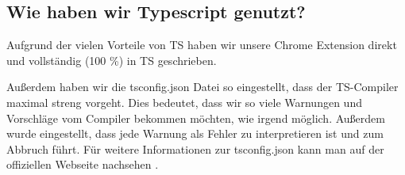 \subsection{Wie haben wir Typescript genutzt?}

Aufgrund der vielen Vorteile von TS haben wir unsere Chrome Extension direkt und vollständig (100 \%) in TS geschrieben.

Außerdem haben wir die tsconfig.json Datei so eingestellt, dass der TS-Compiler maximal streng vorgeht. Dies bedeutet, dass wir so viele Warnungen und Vorschläge vom Compiler bekommen möchten, wie irgend möglich. Außerdem wurde eingestellt, dass jede Warnung als Fehler zu interpretieren ist und zum Abbruch führt. Für weitere Informationen zur tsconfig.json kann man auf der offiziellen Webseite \cite{tsconfig} nachsehen .
